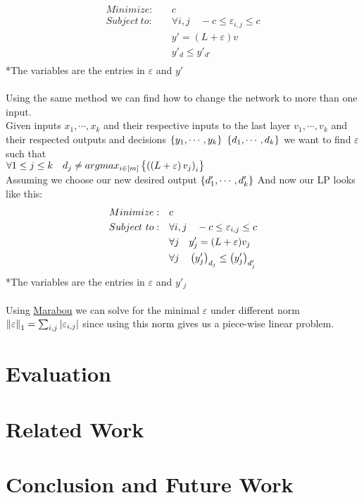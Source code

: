 \documentclass[a4paper]{llncs}
\newcommand{\guy}[1]{\marginpar{\textcolor{orange}{Guy: #1}}}
\begin{document}
\begin{align*}
    Minimize:\quad & c \\
    Subject\ to:\quad & \forall i,j\quad -c \leq\varepsilon_{i,j}\leq c\\
    & y'=(L+\varepsilon)v \\
    & y'_d \leq y'_{d'}\\
\end{align*}
\hspace*{5cm} *The variables are the entries in $\varepsilon$ and $y'$
\\\\
Using the same method we can find how to change the network to more than one input.\\
Given inputs $x_1,\cdots,x_k$ and their respective inputs to the last layer $v_1,\cdots,v_k$ and their respected outputs and decisions $\bracketsC{y_1,\cdots,y_k}\ \bracketsC{d_1,\cdots,d_k}$ we want to find $\varepsilon$ such that\\
$\forall 1\leq j\leq k\quad d_j \neq argmax_{i\in\left[m\right]}\left\lbrace \left(\left(L+\varepsilon\right)v_j\right)_i\right\rbrace$\\
Assuming we choose our new desired output
$\left\lbrace d'_1,\cdots,d'_k\right\rbrace$
And now our LP looks like this:\\
\begin{align*}
    Minimize:\quad & c \\
    Subject\ to:\quad & \forall i,j\quad -c \leq\varepsilon_{i,j}\leq c\\
    & \forall j\quad y'_j=(L+\varepsilon)v_j \\
    & \forall j\quad \left(y'_j\right)_{d_j} \leq \left(y'_j\right)_{d'_j}\\
\end{align*}
\hspace*{5cm} *The variables are the entries in $\varepsilon$ and
$y'_j$
\\\\
Using
\href{http://aisafety.stanford.edu/marabou/MarabouCAV2019.pdf}{Marabou}
we can solve for the minimal $\varepsilon$ under different norm
$\left\lVert\varepsilon\right\rVert_1=\sum_{i,j}\left\lvert\varepsilon_{i,j}\right\rvert$ since using
this norm gives us a piece-wise linear problem.

\guy{Overall, this looks good. Some stuff will need to be moved to other
sections according to the paper layout. We also need to describe the
problem for simultaneous removal of multiple watermarks.}

\section{Evaluation}
\label{sec:evaluation}

\guy{I think you can start populating this section next. We will need
graphs and pictures.}

\section{Related Work}
\label{sec:relatedWork}

\section{Conclusion and Future Work}
\label{sec:conclusion}




\end{document}
